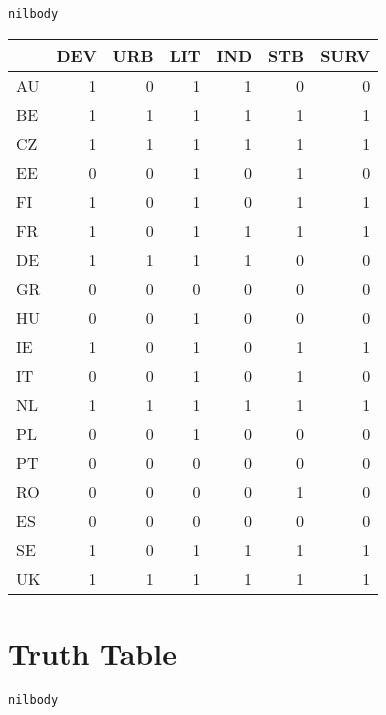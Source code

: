 \documentclass[11pt]{article}
\begin{document}
\begin{verbatim}
nilbody
\end{verbatim}


\begin{tabular}{l|r|r|r|r|r|r}
\hline
  & DEV & URB & LIT & IND & STB & SURV\\
\hline
AU & 1 & 0 & 1 & 1 & 0 & 0\\
\hline
BE & 1 & 1 & 1 & 1 & 1 & 1\\
\hline
CZ & 1 & 1 & 1 & 1 & 1 & 1\\
\hline
EE & 0 & 0 & 1 & 0 & 1 & 0\\
\hline
FI & 1 & 0 & 1 & 0 & 1 & 1\\
\hline
FR & 1 & 0 & 1 & 1 & 1 & 1\\
\hline
DE & 1 & 1 & 1 & 1 & 0 & 0\\
\hline
GR & 0 & 0 & 0 & 0 & 0 & 0\\
\hline
HU & 0 & 0 & 1 & 0 & 0 & 0\\
\hline
IE & 1 & 0 & 1 & 0 & 1 & 1\\
\hline
IT & 0 & 0 & 1 & 0 & 1 & 0\\
\hline
NL & 1 & 1 & 1 & 1 & 1 & 1\\
\hline
PL & 0 & 0 & 1 & 0 & 0 & 0\\
\hline
PT & 0 & 0 & 0 & 0 & 0 & 0\\
\hline
RO & 0 & 0 & 0 & 0 & 1 & 0\\
\hline
ES & 0 & 0 & 0 & 0 & 0 & 0\\
\hline
SE & 1 & 0 & 1 & 1 & 1 & 1\\
\hline
UK & 1 & 1 & 1 & 1 & 1 & 1\\
\hline
\end{tabular}

\section{Truth Table}
\label{sec:orgd1ebb63}

\begin{verbatim}
nilbody
\end{verbatim}
\end{document}
